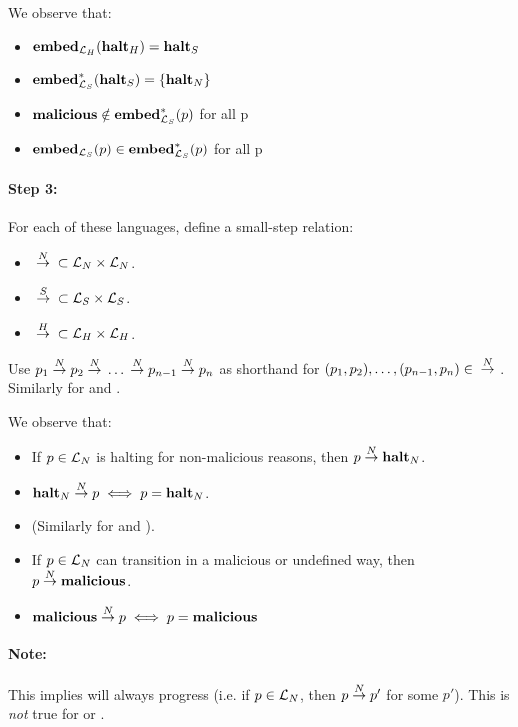 We observe that:

\begin{itemize}
\item ${\mathbf{embed}}_{\mathcal{L}_H}({\mathbf{halt}_H}) = {\mathbf{halt}_S}$
\item $\mathbf{embed}^\ast_{\mathcal{L}_S}({\mathbf{halt}_S}) = \{{\mathbf{halt}_N}\}$
\item ${\mathbf{malicious}} \notin \mathbf{embed}^\ast_{\mathcal{L}_S}(p)$ for all p
\item ${\mathbf{embed}}_{\mathcal{L}_S}(p) \in \mathbf{embed}^\ast_{\mathcal{L}_S}(p)$ for all p
\end{itemize}

\paragraph{Step 3:} For each of these languages, define a small-step relation:

\begin{itemize}
\item ${{}\stackrel{N}{->}{}} \subset \mathcal{L}_N \times \mathcal{L}_N$.
\item ${{}\stackrel{S}{->}{}} \subset \mathcal{L}_S \times \mathcal{L}_S$.
\item ${{}\stackrel{H}{->}{}} \subset \mathcal{L}_H \times \mathcal{L}_H$.
\end{itemize}

Use $p_1 {{}\stackrel{N}{->}{}} p_2 {{}\stackrel{N}{->}{}} \dots {{}\ensuremath{\stackrel{N}{->}}{}} p_{n-1} {{}\stackrel{N}{->}{}} p_n$
as shorthand for $(p_1, p_2), \dots, (p_{n-1}, p_n) \in {{}\ensuremath{\stackrel{N}{->}}{}}$. Similarly
for \simpleo{->} and \higho{->}.

We observe that:

\begin{itemize}
\item If $p \in \mathcal{L}_N$ is halting for non-malicious reasons, then
  $p {{}\stackrel{N}{->}{}} {\mathbf{halt}_N}$.
\item ${\mathbf{halt}_N} {{}\stackrel{N}{->}{}} p \iff p = {\mathbf{halt}_N}$.
\item (Similarly for \simplelang and \highlang).
\item If $p \in \mathcal{L}_N$ can transition in a malicious or undefined way,
  then $p {{}\stackrel{N}{->}{}} {\mathbf{malicious}}$.
\item ${\mathbf{malicious}} {{}\stackrel{N}{->}{}} p \iff p = {\mathbf{malicious}}$
\end{itemize}

\paragraph{Note:} This implies \nativelang will always progress (i.e. if
$p \in \mathcal{L}_N$, then $p {{}\stackrel{N}{->}{}} p'$ for some $p'$). This is \emph{not}
true for \simplelang or \highlang.


